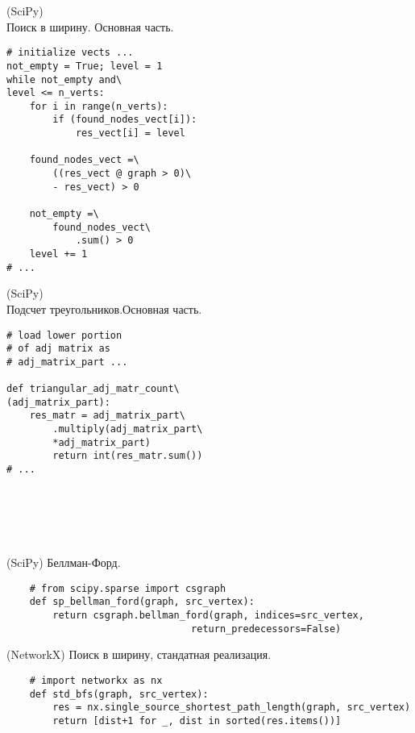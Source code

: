 \begin{minipage}{0.46\textwidth}
\begin{algorithm}[H]
\centering
\caption{(SciPy)\\Поиск в ширину. Основная часть.}\label{bfs_SciPy}
\begin{verbatim}
# initialize vects ...
not_empty = True; level = 1
while not_empty and\
level <= n_verts:
    for i in range(n_verts):
        if (found_nodes_vect[i]):
            res_vect[i] = level

    found_nodes_vect =\ 
        ((res_vect @ graph > 0)\
        - res_vect) > 0

    not_empty =\ 
        found_nodes_vect\ 
            .sum() > 0
    level += 1
# ... 
\end{verbatim}
\end{algorithm}
\end{minipage}\hfill
\begin{minipage}{0.46\textwidth}
\begin{algorithm}[H]
\centering
\caption{(SciPy)\\Подсчет треугольников.Основная часть.}\label{tri_SciPy}
\begin{verbatim}
# load lower portion 
# of adj matrix as
# adj_matrix_part ...

def triangular_adj_matr_count\
(adj_matrix_part):
    res_matr = adj_matrix_part\
        .multiply(adj_matrix_part\
        *adj_matrix_part)
        return int(res_matr.sum())
# ...
    
    
    
    


\end{verbatim}
\end{algorithm}
\end{minipage}

\begin{minipage}{0.96\textwidth}
\begin{algorithm}[H]
    \centering
    \caption{(SciPy) Беллман-Форд.}\label{bford_SciPy}
    \begin{verbatim}
    # from scipy.sparse import csgraph
    def sp_bellman_ford(graph, src_vertex):
        return csgraph.bellman_ford(graph, indices=src_vertex,
                                return_predecessors=False)
    \end{verbatim}
\end{algorithm}
\end{minipage}\hfill

\begin{minipage}{0.96\textwidth}
\begin{algorithm}[H]
    \centering
    \caption{(NetworkX) Поиск в ширину, стандатная реализация.}\label{bfs_std}
    \begin{verbatim}
    # import networkx as nx
    def std_bfs(graph, src_vertex):
        res = nx.single_source_shortest_path_length(graph, src_vertex)
        return [dist+1 for _, dist in sorted(res.items())]
    \end{verbatim}
\end{algorithm}
\end{minipage}\hfill

